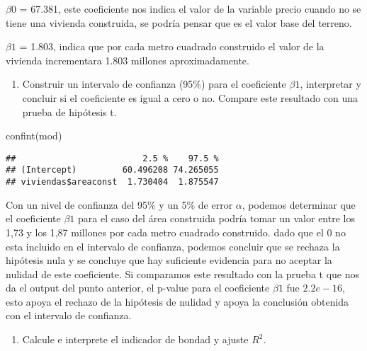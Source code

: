 \documentclass[
]{article}
\newenvironment{Shaded}{\begin{snugshade}}{\end{snugshade}}
\newcommand{\FunctionTok}[1]{\textcolor[rgb]{0.00,0.00,0.00}{#1}}
\newcommand{\NormalTok}[1]{#1}
\newcommand{\OtherTok}[1]{\textcolor[rgb]{0.56,0.35,0.01}{#1}}
\newcommand{\SpecialCharTok}[1]{\textcolor[rgb]{0.00,0.00,0.00}{#1}}
\newcommand{\StringTok}[1]{\textcolor[rgb]{0.31,0.60,0.02}{#1}}
\providecommand{\tightlist}{%
  \setlength{\itemsep}{0pt}\setlength{\parskip}{0pt}}
\begin{document}
\(\beta0\) = 67.381, este coeficiente nos indica el valor de la variable
precio cuando no se tiene una vivienda construida, se podría pensar que
es el valor base del terreno.

\(\beta1\) = 1.803, indica que por cada metro cuadrado construido el
valor de la vivienda incrementara 1.803 millones aproximadamente.

\begin{enumerate}
\def\labelenumi{\arabic{enumi}.}
\setcounter{enumi}{3}
\tightlist
\item
  Construir un intervalo de confianza (95\%) para el coeficiente
  \(\beta1\), interpretar y concluir si el coeficiente es igual a cero o
  no. Compare este resultado con una prueba de hipótesis t.
\end{enumerate}

\begin{Shaded}
\begin{Highlighting}[]
\FunctionTok{confint}\NormalTok{(mod)}
\end{Highlighting}
\end{Shaded}

\begin{verbatim}
##                         2.5 %    97.5 %
## (Intercept)         60.496208 74.265055
## viviendas$areaconst  1.730404  1.875547
\end{verbatim}

Con un nivel de confianza del 95\% y un 5\% de error \(\alpha\), podemos
determinar que el coeficiente \(\beta1\) para el caso del área
construida podría tomar un valor entre los 1,73 y los 1,87 millones por
cada metro cuadrado construido. dado que el 0 no esta incluido en el
intervalo de confianza, podemos concluir que se rechaza la hipótesis
nula y se concluye que hay suficiente evidencia para no aceptar la
nulidad de este coeficiente. Si comparamos este resultado con la prueba
t que nos da el output del punto anterior, el p-value para el
coeficiente \(\beta1\) fue \(2.2e-16\), esto apoya el rechazo de la
hipótesis de nulidad y apoya la conclusión obtenida con el intervalo de
confianza.

\begin{enumerate}
\def\labelenumi{\arabic{enumi}.}
\setcounter{enumi}{4}
\tightlist
\item
  Calcule e interprete el indicador de bondad y ajuste \(R^2\).
\end{enumerate}

\begin{Shaded}
\end{Shaded}
\end{document}
